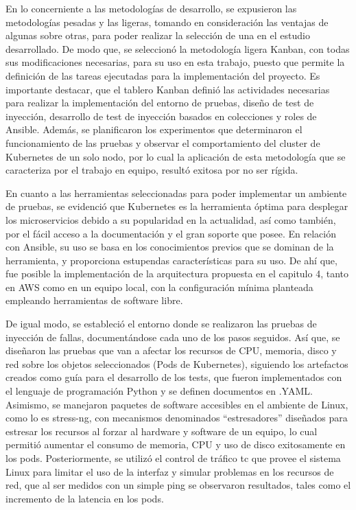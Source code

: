 \par En lo concerniente a las metodologías de desarrollo, se expusieron las metodologías pesadas y las ligeras, tomando en consideración las ventajas de algunas sobre otras, para poder realizar la selección de una en el estudio desarrollado. De modo que, se seleccion\'o la metodología ligera Kanban, con todas sus modificaciones necesarias, para su uso en esta trabajo, puesto que permite la definición de las tareas ejecutadas para la implementación del proyecto. Es importante destacar, que el tablero Kanban definió las actividades necesarias para realizar la implementación del entorno de pruebas, diseño de test de inyección, desarrollo de test de inyección basados en colecciones y roles de Ansible. Además, se planificaron los experimentos que determinaron el funcionamiento de las pruebas y observar el comportamiento del cluster de Kubernetes de un solo nodo, por lo cual la  aplicación de esta metodología que se caracteriza por el trabajo en equipo, result\'o exitosa por no ser rígida. \\ 

\par En cuanto a las herramientas seleccionadas para poder implementar un ambiente de pruebas, se evidenci\'o que Kubernetes es la herramienta óptima para desplegar los microservicios debido a su popularidad en la actualidad, así como también, por el fácil acceso a la documentación y el gran soporte que posee. En relación con Ansible, su uso se basa en los conocimientos previos que se dominan de la herramienta, y proporciona estupendas características para su uso. De ahí que, fue posible la implementación de la arquitectura propuesta en el capitulo 4, tanto en AWS como en un equipo local, con la configuración mínima planteada empleando herramientas de software libre.\\ 

\par De igual modo, se estableció el entorno donde se realizaron las pruebas de inyección de fallas, documentándose cada uno de los pasos seguidos. Así que, se diseñaron las pruebas que van a afectar los recursos de CPU, memoria, disco y red sobre los objetos seleccionados (Pods de Kubernetes), siguiendo los artefactos creados como guía para el desarrollo de los tests, que fueron implementados con el lenguaje de programación Python y se definen documentos en .YAML. Asimismo, se manejaron paquetes de software accesibles en el ambiente de Linux, como lo es stress-ng, con mecanismos denominados ``estresadores'' diseñados para estresar los recursos al forzar al hardware y software de un equipo, lo cual permitió aumentar el consumo de memoria, CPU y uso de disco exitosamente en los pods. Posteriormente, se utiliz\'o el control de tr\'afico tc que provee el sistema Linux para limitar el uso de la interfaz y simular problemas en los recursos de red, que al ser medidos con un simple ping se observaron  resultados, tales como el incremento de la latencia en los pods.\\

